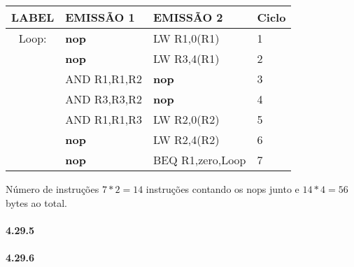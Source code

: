 \documentclass{article}
\begin{document}
\begin{tabular}{|c|l|l|l|}
\hline LABEL & EMISSÃO 1 & EMISSÃO 2 & Ciclo \\
\hline Loop: & \textbf{nop} &  LW R1,0(R1) & 1 \\
\hline & \textbf{nop} & LW R3,4(R1) & 2 \\
\hline & AND R1,R1,R2 & \textbf{nop} & 3 \\
\hline & AND R3,R3,R2 & \textbf{nop} & 4 \\
\hline & AND R1,R1,R3 & LW R2,0(R2) & 5 \\
\hline & \textbf{nop} & LW R2,4(R2) & 6 \\
\hline & \textbf{nop} & BEQ R1,zero,Loop & 7 \\
\hline
\end{tabular}

Número de instruções $7*2=14$ instruções contando os nops junto  e $14*4=56$ 
bytes ao total.


\paragraph{4.29.5}

\paragraph{4.29.6}
\end{document}
